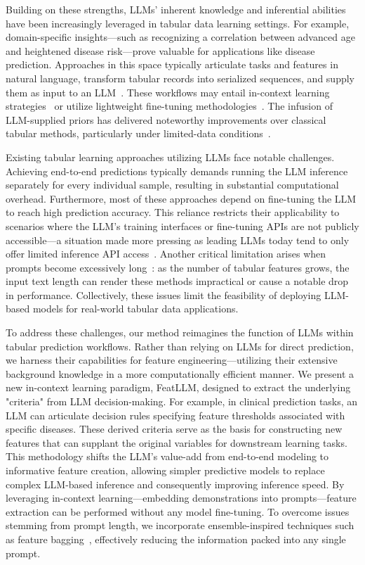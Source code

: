 Building on these strengths, LLMs' inherent knowledge and inferential abilities have been increasingly leveraged in tabular data learning settings. For example, domain-specific insights—such as recognizing a correlation between advanced age and heightened disease risk—prove valuable for applications like disease prediction. Approaches in this space typically articulate tasks and features in natural language, transform tabular records into serialized sequences, and supply them as input to an LLM~\cite{dinh2022lift,wang2023anypredict}. These workflows may entail in-context learning strategies~\cite{nam2023semi} or utilize lightweight fine-tuning methodologies~\cite{dinh2022lift,hegselmann2023tabllm}. The infusion of LLM-supplied priors has delivered noteworthy improvements over classical tabular methods, particularly under limited-data conditions~\cite{hegselmann2023tabllm}.

Existing tabular learning approaches utilizing LLMs face notable challenges. Achieving end-to-end predictions typically demands running the LLM inference separately for every individual sample, resulting in substantial computational overhead. Furthermore, most of these approaches depend on fine-tuning the LLM to reach high prediction accuracy. This reliance restricts their applicability to scenarios where the LLM's training interfaces or fine-tuning APIs are not publicly accessible—a situation made more pressing as leading LLMs today tend to only offer limited inference API access~\cite{anil2023palm,openai2023gpt4}. Another critical limitation arises when prompts become excessively long~\cite{liu2023lost}: as the number of tabular features grows, the input text length can render these methods impractical or cause a notable drop in performance. Collectively, these issues limit the feasibility of deploying LLM-based models for real-world tabular data applications.

To address these challenges, our method reimagines the function of LLMs within tabular prediction workflows. Rather than relying on LLMs for direct prediction, we harness their capabilities for feature engineering—utilizing their extensive background knowledge in a more computationally efficient manner. We present a new in-context learning paradigm, \textsf{FeatLLM}, designed to extract the underlying "criteria" from LLM decision-making. For example, in clinical prediction tasks, an LLM can articulate decision rules specifying feature thresholds associated with specific diseases. These derived criteria serve as the basis for constructing new features that can supplant the original variables for downstream learning tasks. This methodology shifts the LLM’s value-add from end-to-end modeling to informative feature creation, allowing simpler predictive models to replace complex LLM-based inference and consequently improving inference speed. By leveraging in-context learning—embedding demonstrations into prompts—feature extraction can be performed without any model fine-tuning. To overcome issues stemming from prompt length, we incorporate ensemble-inspired techniques such as feature bagging~\cite{breiman2001random}, effectively reducing the information packed into any single prompt.

